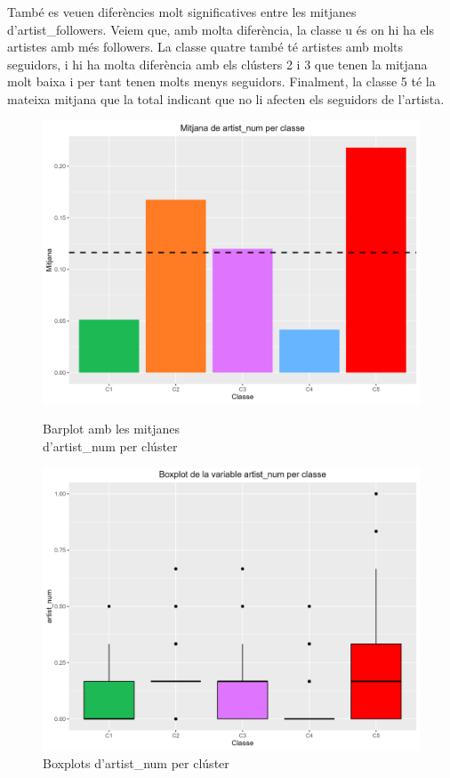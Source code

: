 També es veuen diferències molt significatives entre les mitjanes d'artist\_followers. Veiem que, amb molta diferència, la classe u és on hi ha els artistes amb més followers. La classe quatre també té artistes amb molts seguidors, i hi ha molta diferència amb els clústers 2 i 3 que tenen la mitjana molt baixa i per tant tenen molts menys seguidors. Finalment, la classe 5 té la mateixa mitjana que la total indicant que no li afecten els seguidors de l'artista. 

\begin{figure}[H]
\centering
    \begin{minipage}{.49\textwidth}
        \centering
        \includegraphics[width=0.95\linewidth]{Images/5_Profiling/numeriques/Num_BarPlot_artist_num.png}
        \caption{Barplot amb les mitjanes \\ d'artist\_num per clúster}
        \label{fig:Num_BarPlot_artist_num}
    \end{minipage}%
    \begin{minipage}{.49\textwidth}
        \centering
        \includegraphics[width=0.95\linewidth]{Images/5_Profiling/numeriques/Num_BoxPlot_artist_num.png}
        \caption{Boxplots d'artist\_num per clúster}
        \label{fig:Num_BoxPlot_artist_num}
    \end{minipage}%
\end{figure}
